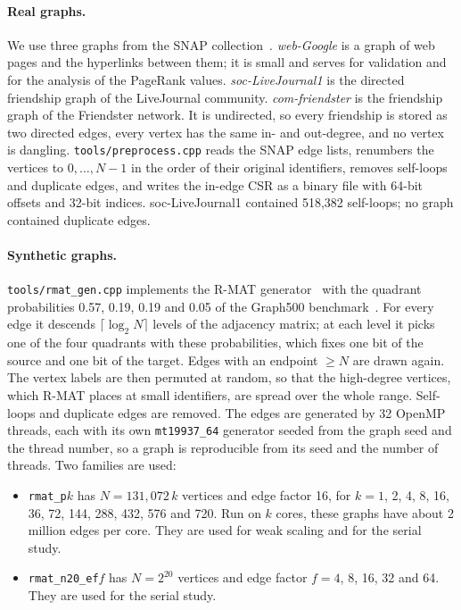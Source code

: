 \documentclass[11pt,a4paper]{article}
\newcommand{\code}[1]{\texttt{#1}}
\begin{document}
\paragraph{Real graphs.} We use three graphs from the SNAP collection~\cite{snap}. \emph{web-Google} is a graph of
web pages and the hyperlinks between them; it is small and serves for validation and for the analysis of the
PageRank values. \emph{soc-LiveJournal1} is the directed friendship graph of the LiveJournal community.
\emph{com-friendster} is the friendship graph of the Friendster network. It is undirected, so every friendship is
stored as two directed edges, every vertex has the same in- and out-degree, and no vertex is dangling.
\code{tools/preprocess.cpp} reads the SNAP edge lists, renumbers the vertices to $0,\ldots,N-1$ in the order of their
original identifiers, removes self-loops and duplicate edges, and writes the in-edge CSR as a binary file with
64-bit offsets and 32-bit indices. soc-LiveJournal1 contained 518,382 self-loops; no graph contained duplicate
edges.

\paragraph{Synthetic graphs.} \code{tools/rmat\_gen.cpp} implements the R-MAT generator~\cite{rmat} with the
quadrant probabilities 0.57, 0.19, 0.19 and 0.05 of the Graph500 benchmark~\cite{graph500}. For every edge it
descends $\lceil\log_2 N\rceil$ levels of the adjacency matrix; at each level it picks one of the four quadrants
with these probabilities, which fixes one bit of the source and one bit of the target. Edges with an endpoint $\ge N$ are
drawn again. The vertex labels are then permuted at random, so that the high-degree vertices, which R-MAT places at
small identifiers, are spread over the whole range. Self-loops and duplicate edges are removed. The edges are
generated by 32 OpenMP threads, each with its own \code{mt19937\_64} generator seeded from the graph seed and the
thread number, so a graph is reproducible from its seed and the number of threads. Two families are used:
\begin{itemize}
\item \code{rmat\_p}$k$ has $N=131{,}072\,k$ vertices and edge factor 16, for $k=1$, 2, 4, 8, 16, 36, 72, 144, 288,
  432, 576 and 720. Run on $k$ cores, these graphs have about 2 million edges per core. They are used for weak
  scaling and for the serial study.
\item \code{rmat\_n20\_ef}$f$ has $N=2^{20}$ vertices and edge factor $f=4$, 8, 16, 32 and 64. They are used for
  the serial study.
\end{itemize}
\end{document}
